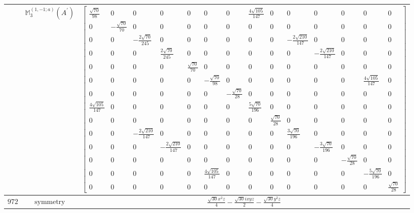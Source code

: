 \documentclass[fleqn,8pt,landscape]{jsarticle}
\begin{document}
\begin{longtable}{ccc}
$  $ & $ \mathbb{M}_{3}^{(1,-1;a)}(A^{\prime}) $ & $ \begin{bmatrix} \frac{\sqrt{70}}{98} & 0 & 0 & 0 & 0 & 0 & 0 & \frac{4 \sqrt{105}}{147} & 0 & 0 & 0 & 0 & 0 & 0 \\ 0 & - \frac{\sqrt{70}}{70} & 0 & 0 & 0 & 0 & 0 & 0 & 0 & 0 & 0 & 0 & 0 & 0 \\ 0 & 0 & - \frac{2 \sqrt{70}}{245} & 0 & 0 & 0 & 0 & 0 & 0 & - \frac{2 \sqrt{210}}{147} & 0 & 0 & 0 & 0 \\ 0 & 0 & 0 & \frac{2 \sqrt{70}}{245} & 0 & 0 & 0 & 0 & 0 & 0 & - \frac{2 \sqrt{210}}{147} & 0 & 0 & 0 \\ 0 & 0 & 0 & 0 & \frac{\sqrt{70}}{70} & 0 & 0 & 0 & 0 & 0 & 0 & 0 & 0 & 0 \\ 0 & 0 & 0 & 0 & 0 & - \frac{\sqrt{70}}{98} & 0 & 0 & 0 & 0 & 0 & 0 & \frac{4 \sqrt{105}}{147} & 0 \\ 0 & 0 & 0 & 0 & 0 & 0 & - \frac{\sqrt{70}}{28} & 0 & 0 & 0 & 0 & 0 & 0 & 0 \\ \frac{4 \sqrt{105}}{147} & 0 & 0 & 0 & 0 & 0 & 0 & \frac{5 \sqrt{70}}{196} & 0 & 0 & 0 & 0 & 0 & 0 \\ 0 & 0 & 0 & 0 & 0 & 0 & 0 & 0 & \frac{\sqrt{70}}{28} & 0 & 0 & 0 & 0 & 0 \\ 0 & 0 & - \frac{2 \sqrt{210}}{147} & 0 & 0 & 0 & 0 & 0 & 0 & \frac{3 \sqrt{70}}{196} & 0 & 0 & 0 & 0 \\ 0 & 0 & 0 & - \frac{2 \sqrt{210}}{147} & 0 & 0 & 0 & 0 & 0 & 0 & - \frac{3 \sqrt{70}}{196} & 0 & 0 & 0 \\ 0 & 0 & 0 & 0 & 0 & 0 & 0 & 0 & 0 & 0 & 0 & - \frac{\sqrt{70}}{28} & 0 & 0 \\ 0 & 0 & 0 & 0 & 0 & \frac{4 \sqrt{105}}{147} & 0 & 0 & 0 & 0 & 0 & 0 & - \frac{5 \sqrt{70}}{196} & 0 \\ 0 & 0 & 0 & 0 & 0 & 0 & 0 & 0 & 0 & 0 & 0 & 0 & 0 & \frac{\sqrt{70}}{28} \end{bmatrix} $ \\ \hline
$ 972 $ & $ \text{symmetry} $ & $ \frac{\sqrt{30} x^{2} z}{4} - \frac{\sqrt{30} i x y z}{2} - \frac{\sqrt{30} y^{2} z}{4} $ \\

\end{longtable}
\end{document}
